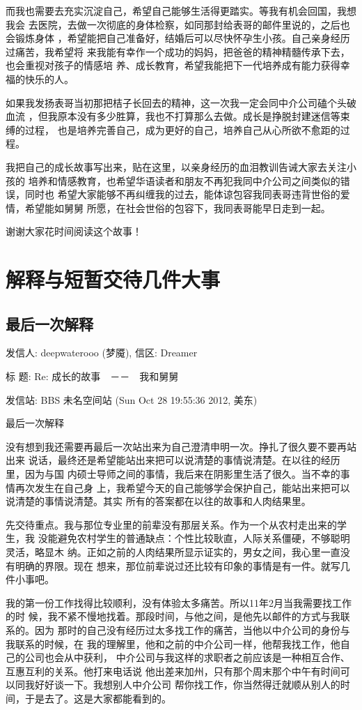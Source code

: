 \documentclass[12pt]{book}
\begin{document}
而我也需要去充实沉淀自己，希望自己能够生活得更踏实。等我有机会回国，我想我会
去医院，去做一次彻底的身体检察，如同那封给表哥的邮件里说的，之后也会锻炼身体
，希望能把自己准备好，结婚后可以尽快怀孕生小孩。自己亲身经历过痛苦，我希望将
来我能有幸作一个成功的妈妈，把爸爸的精神精髓传承下去，也会重视对孩子的情感培
养、成长教育，希望我能把下一代培养成有能力获得幸福的快乐的人。

如果我发扬表哥当初那把桔子长回去的精神，这一次我一定会同中介公司磕个头破血流
，但我原本没有多少胜算，我也不打算那么去做。成长是挣脱封建迷信等束缚的过程，
也是培养完善自己，成为更好的自己，培养自己从心所欲不愈距的过程。

我把自己的成长故事写出来，贴在这里，以亲身经历的血泪教训告诫大家去关注小孩的
培养和情感教育，也希望华语读者和朋友不再犯我同中介公司之间类似的错误，同时也
希望大家能够不再纠缠我的过去，能体谅包容我同表哥违背世俗的爱情，希望能如舅舅
所愿，在社会世俗的包容下，我同表哥能早日走到一起。

谢谢大家花时间阅读这个故事！

\chapter{解释与短暂交待几件大事}
\label{sec-12}
\section{最后一次解释}
\label{sec-12-1}
发信人: deepwaterooo (梦魇), 信区: Dreamer

标  题: Re: 成长的故事　－－　我和舅舅

发信站: BBS 未名空间站 (Sun Oct 28 19:55:36 2012, 美东)

最后一次解释

没有想到我还需要再最后一次站出来为自己澄清申明一次。挣扎了很久要不要再站出来
说话，最终还是希望能站出来把可以说清楚的事情说清楚。在以往的经历里，因为与国
内硕士导师之间的事情，我后来在阴影里生活了很久。当不幸的事情再次发生在自己身
上，我希望今天的自己能够学会保护自己，能站出来把可以说清楚的事情说清楚。其实
所有的答案都在以往的故事和人肉结果里。

先交待重点。我与那位专业里的前辈没有那层关系。作为一个从农村走出来的学生，我
没能避免农村学生的普通缺点：个性比较耿直，人际关系僵硬，不够聪明灵活，略显木
纳。正如之前的人肉结果所显示证实的，男女之间，我心里一直没有明确的界限。现在
想来，那位前辈说过还比较有印象的事情是有一件。就写几件小事吧。

我的第一份工作找得比较顺利，没有体验太多痛苦。所以11年2月当我需要找工作的时
候，我不紧不慢地找着。那段时间，与他之间，是他先以邮件的方式与我联系的。因为
那时的自己没有经历过太多找工作的痛苦，当他以中介公司的身份与我联系的时候，在
我的理解里，他和之前的中介公司一样，他帮我找工作，他自己的公司也会从中获利，
中介公司与我这样的求职者之前应该是一种相互合作、互惠互利的关系。他打来电话说
他出差来加州，只有那个周末那个中午有时间可以同我好好谈一下。我想别人中介公司
帮你找工作，你当然得迁就顺从别人的时间，于是去了。这是大家都能看到的。
\end{document}
